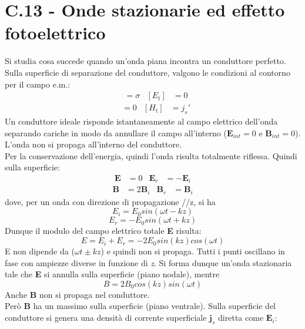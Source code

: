 \documentclass{article}
\begin{document}
\section*{C.13 - Onde stazionarie ed effetto fotoelettrico}
Si studia cosa succede quando un'onda piana incontra un conduttore perfetto.\\
Sulla superficie di separazione del conduttore, valgono le condizioni al contorno per il campo e.m.:
\begin{align*}
[D_n]&=\sigma  & [E_t]&=0
\nonumber
\end{align*}
\begin{align*}
[B_n]&=0  & [H_t]&=j_s'
\nonumber
\end{align*}
Un conduttore ideale risponde istantaneamente al campo elettrico dell’onda separando cariche in modo da annullare il campo all’interno ($\textbf{E}_{int}=0$ e $\textbf{B}_{int}=0$). L’onda non si propaga all’interno del conduttore. \\
Per la conservazione dell’energia, quindi l’onda risulta
totalmente riflessa. Quindi sulla superficie:
\begin{align*}
\textbf{E}&=0 & \textbf{E}_r &=-\textbf{E}_i
\nonumber
\end{align*}
\begin{align*}
\textbf{B}&=2\textbf{B}_i  & \textbf{B}_r &=\textbf{B}_i
\nonumber
\end{align*}
dove, per un onda con direzione di propagazione //z, si ha
\begin{equation}
    E_i=E_0 sin(\omega t - kz)
    \nonumber
\end{equation}
\begin{equation}
    E_r=-E_0 sin(\omega t + kz)
    \nonumber
\end{equation}
Dunque il modulo del campo elettrico totale \textbf{E} risulta:
\begin{equation}
E=E_i+E_r
=-2E_0sin(kz)cos(\omega t)
\nonumber
\end{equation}
E non dipende da ($\omega t ± kz$) e quindi non si propaga. Tutti i punti oscillano in fase con ampiezze diverse in funzione di \emph{z}. Si forma dunque un’onda stazionaria tale che \textbf{E} si annulla sulla superficie (piano nodale), mentre
\begin{equation}
    B=2B_0cos(kz)sin(\omega t)
    \nonumber
\end{equation}
Anche \textbf{B} non si propaga nel conduttore. \\
Però \textbf{B} ha un massimo sulla superficie (piano ventrale). Sulla superficie del conduttore si genera una densità di corrente superficiale $\textbf{j}_s$ diretta come $\textbf{E}_i$:
\end{document}
